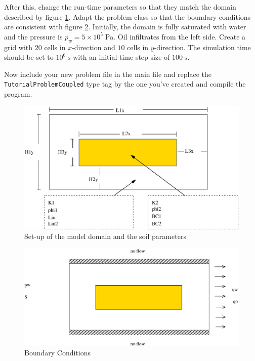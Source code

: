 After this, change the run-time parameters so that they match the
domain described by figure \ref{tutorial-coupled:ex2_Domain}. Adapt
the problem class so that the boundary conditions are consistent with
figure \ref{tutorial-coupled:ex2_BC}. Initially, the domain is fully
saturated with water and the pressure is $p_w = 5 \times
10^5\;\text{Pa}$.  Oil infiltrates from the left side. Create a grid
with $20$ cells in $x$-direction and $10$ cells in $y$-direction. The
simulation time should be set to $10^6\;\text{s}$ with an
initial time step size of $100\;\text{s}$.

Now include your new problem file in the main file and replace the
\texttt{TutorialProblemCoupled} type tag by the one you've created and
compile the program.


\begin{figure}[ht]
\centering
\includegraphics[width=0.8\linewidth,keepaspectratio]{EPS/Ex2_Domain.eps}
\caption{Set-up of the model domain and the soil parameters}\label{tutorial-coupled:ex2_Domain}
\end{figure}

\begin{figure}[ht]
\centering
\includegraphics[width=0.8\linewidth,keepaspectratio]{EPS/Ex2_Boundary.eps}
\caption{Boundary Conditions}\label{tutorial-coupled:ex2_BC}
\end{figure}

